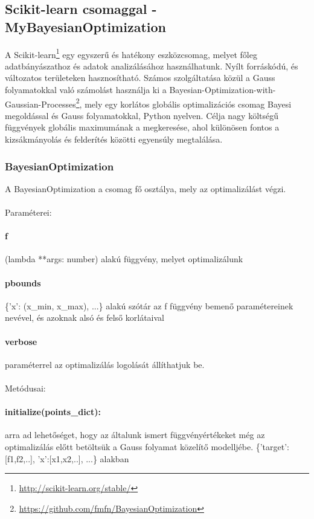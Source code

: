 \subsection{Scikit-learn csomaggal - MyBayesianOptimization}
A Scikit-learn\footnote{\url{http://scikit-learn.org/stable/}} egy egyszerű és hatékony eszközcsomag, melyet főleg adatbányászathoz és adatok analizálásához használhatunk. Nyílt forráskódú, és változatos területeken hasznosítható. Számos szolgáltatása közül a Gauss folyamatokkal való számolást használja ki a Bayesian-Optimization-with-Gaussian-Processes\footnote{\url{https://github.com/fmfn/BayesianOptimization}}, mely egy korlátos globális optimalizációs csomag Bayesi megoldással és Gauss folyamatokkal, Python nyelven. Célja nagy költségű függvények globális maximumának a megkeresése, ahol különösen fontos a kizsákmányolás és felderítés közötti egyensúly megtalálása.

\subsubsection{BayesianOptimization}

A BayesianOptimization a csomag fő osztálya, mely az optimalizálást végzi.\\\\
Paraméterei:

\paragraph{f} (lambda **args: number) alakú függvény, melyet optimalizálunk
\paragraph{pbounds} \{'x': (x\_min, x\_max), ...\} alakú szótár
az f függvény bemenő paramétereinek nevével, és azoknak alsó és felső korlátaival
\paragraph{verbose} paraméterrel az optimalizálás logolását állíthatjuk be.\\\\
Metódusai:

\paragraph{initialize(points\_dict):} arra ad lehetőséget, hogy az általunk ismert függvényértékeket még az optimalizálás előtt betöltsük a Gauss folyamat közelítő modelljébe. \{'target': [f1,f2,..], 'x':[x1,x2,..], ...\} alakban
